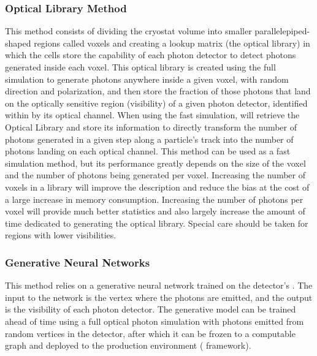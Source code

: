 \documentclass[../main-v1.tex]{subfiles}
\begin{document}
\subsubsection{Optical Library Method}

This method consists of dividing the cryostat volume into smaller parallelepiped-shaped regions called voxels and creating a lookup matrix %
(the optical library) %
in which the cells store the capability of each photon detector to detect photons generated inside each voxel.
This optical library is created using the full  simulation to generate photons anywhere inside a given voxel, with random direction and polarization, and then store the fraction of those photons that land on the optically sensitive region (visibility) of a given photon detector, identified within   by its optical channel. When using the fast simulation,   will retrieve the Optical Library and store its information to directly transform the number %
of photons generated in a given step along a particle's track into the number of photons landing on each optical channel.
This method can %
be used as a fast simulation method, but %
its performance greatly depends on the size of the voxel and the number of photons being generated per voxel. Increasing the number of voxels in a library will improve the description and reduce the bias at the cost of a large increase in memory consumption. Increasing the number of photons per voxel will provide much better statistics and also largely increase the amount of time dedicated to generating the optical library. Special care should be taken for regions with %
lower visibilities.

\subsubsection{Generative Neural Networks}

This method relies on a generative neural network  trained on the detector's . %
The input to the network is the vertex where the photons are emitted, and the output is the visibility of each photon detector. 
The generative model can be trained ahead of time using a full   optical photon simulation with photons emitted from random vertices in the detector, after which it can be frozen to a computable graph and deployed to the production environment (  framework).
\end{document}
